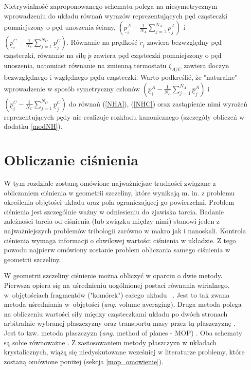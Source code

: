 \documentclass[12pt,a4paper,openright]{report} %
\begin{document}
Nietrywialność zaproponowanego schematu polega na niesymetrycznym wprowadzeniu do układu równań wyrazów reprezentujących pęd cząsteczki pomniejszony o pęd unoszenia ściany, $(\underline{p}^A_i-\frac{1}{N_A}\sum_{j=1}^{N_A} \underline{p}^A_j)$ i $(\underline{p}^C_i-\frac{1}{N_C}\sum_{j=1}^{N_C} \underline{p}^C_j)$. Równanie na prędkość $\underline{\dot{r}}_i$ zawiera bezwzględny pęd cząsteczki, równanie na siłę $\underline{\dot{p}}$ zawiera pęd cząsteczki pomniejszony o pęd unoszenia, natomiast równanie na zmienną termostatu $\dot{\zeta}_{A/C}$ zawiera iloczyn bezwzględnego i względnego pędu cząsteczki.  Warto podkreślić, że "naturalne" wprowadzenie w sposób symetryczny członów $(\underline{p}^A_i-\frac{1}{N_A}\sum_{j=1}^{N_A} \underline{p}^A_j)$ i $(\underline{p}^C_i-\frac{1}{N_C}\sum_{j=1}^{N_C} \underline{p}^C_j)$ do równań  (\ref{NHA}), (\ref{NHC}) oraz zastąpienie nimi wyrażeń reprezentujących pędy nie realizuje rozkładu kanonicznego (szczegóły obliczeń w dodatku \ref{modNH}).
%
\section{Obliczanie ciśnienia}
\label{cisnienie}
W tym rozdziale zostaną omówione najważniejsze trudności związane z obliczaniem ciśnienia w geometrii szczeliny, które wynikają m. in. z problemu określenia objętości układu oraz pola ograniczającej go powierzchni. Problem ciśnienia jest szczególnie ważny w odniesieniu do zjawiska tarcia. Badanie zależności tarcia od ciśnienia (lub związku między nimi) stanowi jeden z najważniejszych problemów tribologii zarówno w makro jak i nanoskali. Kontrola ciśnienia wymaga informacji o chwilowej wartości ciśnienia w układzie. Z tego powodu najpierw omówiony zostanie problem obliczania samego ciśnienia w geometrii szczeliny.
%

W geometrii szczeliny ciśnienie można obliczyć w oparciu o dwie metody.
Pierwsza opiera się na uśrednieniu uogólnionej postaci równania wirialnego, w~objętościach fragmentów ("komórek") całego układu ~\cite{CormierVA}. Jest to tak zwana metoda uśredniania w~objętości (\textit{ang.} volume averaging).
Druga metoda polega na obliczeniu wartości siły między cząsteczkami układu po dwóch stronach arbitralnie wybranej płaszczyzny oraz transportu masy przez tą płaszczyznę \cite{Todd}. Jest to tzw. metoda płaszczyzn (\textit{ang.} method of planes - MOP) \cite{Todd}.
Oba schematy są sobie równoważne \cite{HeyesSmithDini2011}.
Z zastosowaniem metody płaszczyzn w układach krystalicznych, wiążą się niedyskutowane wcześniej w literaturze problemy, które zostaną omówione poniżej (sekcja \ref{mop_omowienie}).
%
\end{document}
